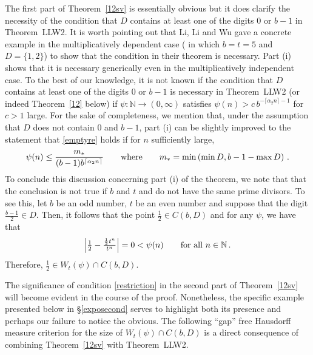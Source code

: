 \documentclass[12pt]{article}
\theoremstyle{definition}
\theoremstyle{remark}
\newtheorem{remark}{{Remark}}[section]
\begin{document}
\bigskip 
 
 The first part  of Theorem~\ref{12sv} is essentially obvious but it does clarify the necessity of the  condition that  $D$   contains at least one of the digits  $0$ or $b-1$ in Theorem~LLW2.  It is worth pointing out that  Li, Li and Wu  gave a concrete example in the multiplicatively dependent case (\!\!\cite[Example~3.1]{LLW2025} in which  $b=t=5$ and $D=\{1,2\}$)  to show that the condition in their theorem is  necessary.  Part (i) shows that it is necessary generically even in  the  multiplicatively independent case. To the best of our knowledge,   it is not known if the condition  that  $D$  contains at least one of the digits  $0$ or $b-1$ is necessary in Theorem~LLW2 (or indeed Theorem~\ref{12} below) if $\psi:\mathbb{N}\to(0,\infty)$  satisfies     $\psi(n) > c \,   b^{-\lceil\alpha_{2}n\rceil-1}$ for $c >1 $ large. For the sake of completeness, we mention that, under the assumption that $D$ does not contain  $0$ and $b-1$,  part (i) can be slightly improved to the statement that  \eqref{emptyre} holds if for $n$ sufficiently large, 
 $$\psi(n)\le \frac{m_{*}}{(b-1)b^{\lceil\alpha_{2}n\rceil}}  \qquad  {\rm where }   \qquad m_{*}=\min\left(\min D,b-1-\max D\right)   \, . $$    To conclude this discussion concerning part (i) of the theorem, we note that that  the conclusion is not true if   $b$ and $t$ 
 and do not have the same prime divisors. To see this, let  $b $ be an odd number, $t $ be an even number and suppose that  the digit  $\frac{b-1}{2}\in D$. Then, it follows that the point 
$\frac{1}{2}\in C(b,D)  $
and for any $\psi$, we have that  
$$\textstyle{\left|\frac{1}{2}-\frac{\frac{1}{2}t^{n}}{t^{n}}\right|=0<\psi(n)}   \qquad {\rm for \  all \ }  n \in \mathbb{N}   \, .    $$
Therefore,  $\frac{1}{2}\in W_{t}(\psi)\cap C(b,D).$




The significance of condition \eqref{restriction} in the second part of Theorem~\ref{12sv}  will become evident in the course of the proof. Nonetheless, the specific example presented below in \S\ref{exposecond} serves to highlight both its presence  and perhaps our failure to notice the obvious.  The following ``gap'' free Hausdorff measure criterion for the size of $W_{t}(\psi)\cap C(b,D)$  is a direct consequence of combining Theorem~\ref{12sv}  with Theorem~LLW2.
\end{document}
